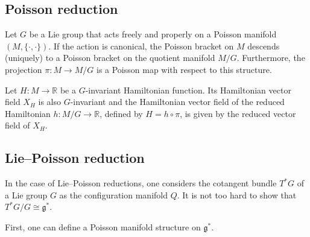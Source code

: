 \subsection{Poisson reduction}


    \begin{theorem}
        Let $G$ be a Lie group that acts freely and properly on a Poisson manifold $(M,\{\cdot,\cdot\})$. If the action is canonical, the Poisson bracket on $M$ descends (uniquely) to a Poisson bracket on the quotient manifold $M/G$. Furthermore, the projection $\pi:M\rightarrow M/G$ is a Poisson map with respect to this structure.
    \end{theorem}
    \begin{property}
        Let $H:M\rightarrow\mathbb{R}$ be a $G$-invariant Hamiltonian function. Its Hamiltonian vector field $X_H$ is also $G$-invariant and the Hamiltonian vector field of the reduced Hamiltonian $h:M/G\rightarrow\mathbb{R}$, defined by $H=h\circ\pi$, is given by the reduced vector field of $X_H$.
    \end{property}

\subsection{Lie--Poisson reduction}

    In the case of Lie--Poisson reductions, one considers the cotangent bundle $T^*G$ of a Lie group $G$ as the configuration manifold $Q$. It is not too hard to show that $T^*G/G\cong\mathfrak{g}^*$.

    First, one can define a Poisson manifold structure on $\mathfrak{g}^*$.

